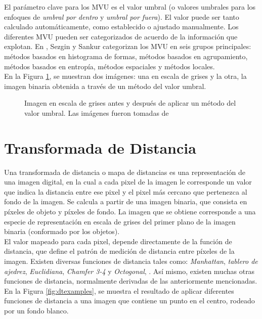 El par\'ametro clave para los MVU es el valor umbral (o valores umbrales para los enfoques de
\emph{umbral por dentro} y \emph{umbral por fuera}). El valor puede ser tanto calculado
autom\'aticamente, como establecido o ajustado manualmente. Los diferentes MVU pueden ser categorizados 
de acuerdo de la informaci\'on que explotan. En \cite[p.147]{thres}, Sezgin y Sankur
categorizan los MVU en seis grupos principales: m\'etodos basados en histograma de formas,  
m\'etodos basados en agrupamiento, m\'etodos basados en entrop\'ia, m\'etodos espaciales y
m\'etodos locales.\\

En la Figura \ref{fig:thres1}, se muestran dos im\'agenes: una en escala de grises y la 
otra, la imagen binaria obtenida a trav\'es de un m\'etodo del valor umbral.

\begin{figure}[h t b p ! H]
  \centering
\qquad
  \caption[Imagen en escala de grises antes y despu\'es de aplicar un m\'etodo del valor umbral ]{Imagen en escala de grises antes y despu\'es de 
    aplicar un m\'etodo del valor umbral. Las im\'agenes fueron tomadas de \cite{web:thresholding}}
  \label{fig:thres1}
\end{figure}

\section{Transformada de Distancia}
\label{sec:dt}

Una transformada de distancia o mapa de distancias es una representaci\'on de
una imagen digital, en la cual a cada pixel de la imagen le corresponde
un valor que indica la distancia entre ese pixel y el pixel m\'as cercano que pertenezca
al fondo de la imagen. Se calcula a partir de una imagen binaria, que consista
en p\'ixeles de objeto y p\'ixeles de fondo. La imagen que se obtiene corresponde a
una especie de representaci\'on en escala de grises del primer plano de la imagen
binaria (conformado por los objetos).\\
El valor mapeado para cada pixel, depende directamente de la funci\'on de distancia,
que define el patr\'on de medici\'on de distancia entre p\'ixeles de la imagen. Existen
diversas funciones de distancia tales como: \emph{Manhattan},
\emph{tablero de ajedrez}, \emph{Euclidiana}, \emph{Chamfer 3-4} y \emph{Octogonal}, 
\cite[p.363]{dtresearch}. As\'i mismo, existen muchas otras funciones de
distancia, normalmente derivadas de las anteriormente mencionadas.
En la Figura \ref{fig:dtexamples}, se muestra el resultado de aplicar 
diferentes funciones de distancia a una imagen que contiene un punto en el centro,
rodeado por un fondo blanco.

